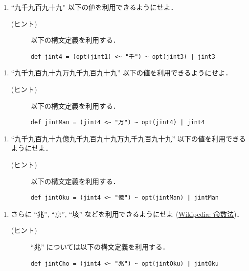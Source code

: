 \documentclass[a4j]{jsarticle}
\begin{document}
\begin{enumerate}
\item ``九千九百九十九'' 以下の値を利用できるようにせよ．
\begin{description}
\item[(ヒント)] 以下の構文定義を利用する．

\begin{verbatim}
def jint4 = (opt(jint1) <~ "千") ~ opt(jint3) | jint3
\end{verbatim}
\end{description}
\end{enumerate}
\begin{enumerate}
\item ``九千九百九十九万九千九百九十九'' 以下の値を利用できるようにせよ．
\begin{description}
\item[(ヒント)] 以下の構文定義を利用する．

\begin{verbatim}
def jintMan = (jint4 <~ "万") ~ opt(jint4) | jint4
\end{verbatim}
\end{description}
\end{enumerate}
\begin{enumerate}
\item ``九千九百九十九億九千九百九十九万九千九百九十九'' 以下の値を利用できるようにせよ．
\begin{description}
\item[(ヒント)] 以下の構文定義を利用する．

\begin{verbatim}
def jintOku = (jint4 <~ "億") ~ opt(jintMan) | jintMan
\end{verbatim}
\end{description}
\end{enumerate}
\begin{enumerate}
\item さらに ``兆'', ``京'', ``垓'' などを利用できるようにせよ (\href{https://ja.wikipedia.org/wiki/命数法}{Wikipedia: 命数法})．
\begin{description}
\item[(ヒント)] ``兆'' については以下の構文定義を利用する．

\begin{verbatim}
def jintCho = (jint4 <~ "兆") ~ opt(jintOku) | jintOku
\end{verbatim}
\end{description}
\end{enumerate}
\end{document}
